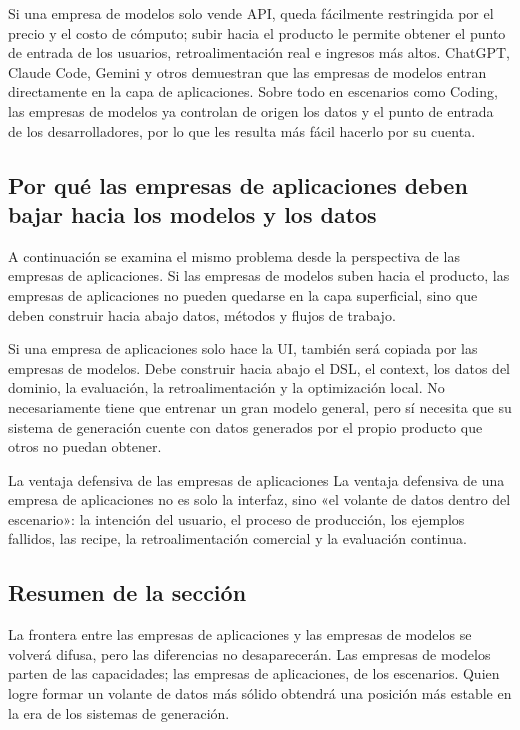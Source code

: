 \documentclass[a4paper]{article}
\begin{document}
Si una empresa de modelos solo vende API, queda fácilmente restringida por el precio y el costo de cómputo; subir hacia el producto le permite obtener el punto de entrada de los usuarios, retroalimentación real e ingresos más altos. ChatGPT, Claude Code, Gemini y otros demuestran que las empresas de modelos entran directamente en la capa de aplicaciones. Sobre todo en escenarios como Coding, las empresas de modelos ya controlan de origen los datos y el punto de entrada de los desarrolladores, por lo que les resulta más fácil hacerlo por su cuenta.

\subsection{Por qué las empresas de aplicaciones deben bajar hacia los modelos y los datos}

A continuación se examina el mismo problema desde la perspectiva de las empresas de aplicaciones. Si las empresas de modelos suben hacia el producto, las empresas de aplicaciones no pueden quedarse en la capa superficial, sino que deben construir hacia abajo datos, métodos y flujos de trabajo.

Si una empresa de aplicaciones solo hace la UI, también será copiada por las empresas de modelos. Debe construir hacia abajo el DSL, el context, los datos del dominio, la evaluación, la retroalimentación y la optimización local. No necesariamente tiene que entrenar un gran modelo general, pero sí necesita que su sistema de generación cuente con datos generados por el propio producto que otros no puedan obtener.

\begin{importantbox}{La ventaja defensiva de las empresas de aplicaciones}
La ventaja defensiva de una empresa de aplicaciones no es solo la interfaz, sino «el volante de datos dentro del escenario»: la intención del usuario, el proceso de producción, los ejemplos fallidos, las recipe, la retroalimentación comercial y la evaluación continua.
\end{importantbox}

\subsection{Resumen de la sección}

La frontera entre las empresas de aplicaciones y las empresas de modelos se volverá difusa, pero las diferencias no desaparecerán. Las empresas de modelos parten de las capacidades; las empresas de aplicaciones, de los escenarios. Quien logre formar un volante de datos más sólido obtendrá una posición más estable en la era de los sistemas de generación.
\end{document}
